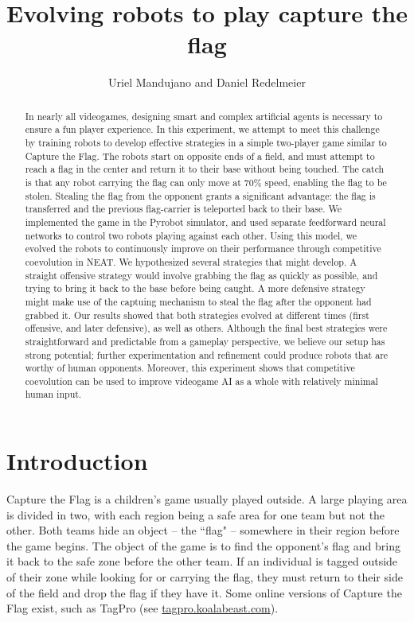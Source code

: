 \documentclass[11pt]{article}
\title{Evolving robots to play capture the flag}
\author{Uriel Mandujano and Daniel Redelmeier}
\date{} %
\begin{document}
\maketitle

\begin{abstract}

  In nearly all videogames, designing smart and complex artificial agents is necessary to ensure a fun player experience. In this experiment, we attempt to meet this challenge by training robots to develop effective strategies in a simple two-player game similar to Capture the Flag. The robots start on opposite ends of a field, and must attempt to reach a flag in the center and return it to their base without being touched. The catch is that any robot carrying the flag can only move at 70\% speed, enabling the flag to be stolen. Stealing the flag from the opponent grants a significant advantage: the flag is transferred and the previous flag-carrier is teleported back to their base. We implemented the game in the Pyrobot simulator, and used separate feedforward neural networks to control two robots playing against each other. Using this model, we evolved the robots to continuously improve on their performance through competitive coevolution in NEAT. We hypothesized several strategies that might develop. A straight offensive strategy would involve grabbing the flag as quickly as possible, and trying to bring it back to the base before being caught. A more defensive strategy might make use of the captuing mechanism to steal the flag after the opponent had grabbed it. Our results showed that both strategies evolved at different times (first offensive, and later defensive), as well as others. Although the final best strategies were straightforward and predictable from a gameplay perspective, we believe our setup has strong potential; further experimentation and refinement could produce robots that are worthy of human opponents. Moreover, this experiment shows that competitive coevolution can be used to improve videogame AI as a whole with relatively minimal human input.
  
\end{abstract}

\section{Introduction}

  Capture the Flag is a children's game usually played outside. A large playing area is divided in two, with each region being a safe area for one team but not the other. Both teams hide an object -- the ``flag" -- somewhere in their region before the game begins. The object of the game is to find the opponent's flag and bring it back to the safe zone before the other team. If an individual is tagged outside of their zone while looking for or carrying the flag, they must return to their side of the field and drop the flag if they have it. Some online versions of Capture the Flag exist, such as TagPro (see \url{tagpro.koalabeast.com}).
  
\end{document}
